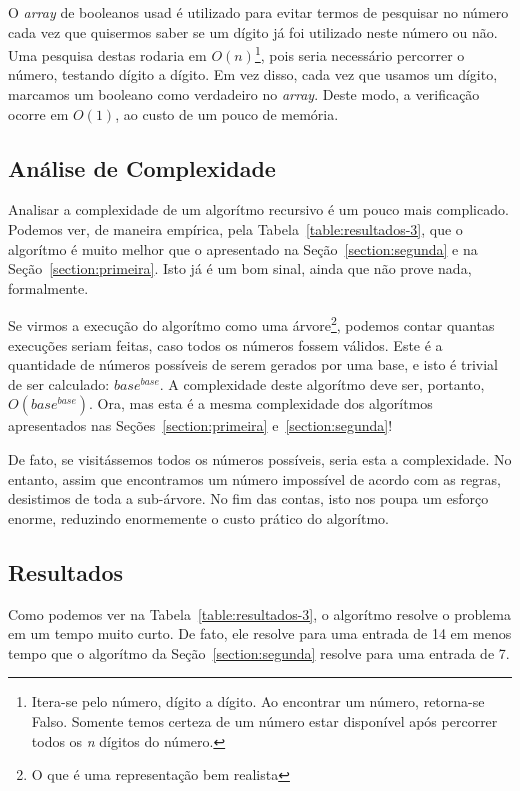 \documentclass[12pt]{article}
\begin{document}
O {\em array} de booleanos {\sf usad} é utilizado para evitar termos de pesquisar no número cada vez que quisermos saber se um dígito já foi utilizado neste número ou não. Uma pesquisa destas rodaria em $O(n)$\footnote{Itera-se pelo número, dígito a dígito. Ao encontrar um número, retorna-se Falso. Somente temos certeza de um número estar disponível após percorrer todos os {\em n} dígitos do número.}, pois seria necessário percorrer o número, testando dígito a dígito. Em vez disso, cada vez que usamos um dígito, marcamos um booleano como verdadeiro no {\em array}. Deste modo, a verificação ocorre em $O(1)$, ao custo de um pouco de memória.

\subsection{Análise de Complexidade}\label{section:terceira:complexidade}

Analisar a complexidade de um algorítmo recursivo é um pouco mais complicado. Podemos ver, de maneira empírica, pela Tabela~\ref{table:resultados-3}, que o algorítmo é muito melhor que o apresentado na Seção~\ref{section:segunda} e na Seção~\ref{section:primeira}. Isto já é um bom sinal, ainda que não prove nada, formalmente.

Se virmos a execução do algorítmo como uma árvore\footnote{O que é uma representação bem realista}, podemos contar quantas execuções seriam feitas, caso todos os números fossem válidos. Este é a quantidade de números possíveis de serem gerados por uma base, e isto é trivial de ser calculado: $base^{base}$. A complexidade deste algorítmo deve ser, portanto, $O(base^{base})$. Ora, mas esta é a mesma complexidade dos algorítmos apresentados nas Seções~\ref{section:primeira} e~\ref{section:segunda}!

De fato, se visitássemos todos os números possíveis, seria esta a complexidade. No entanto, assim que encontramos um número impossível de acordo com as regras, desistimos de toda a sub-árvore. No fim das contas, isto nos poupa um esforço enorme, reduzindo enormemente o custo prático do algorítmo.

\subsection{Resultados}\label{section:terceira:resultados}

Como podemos ver na Tabela~\ref{table:resultados-3}, o algorítmo resolve o problema em um tempo muito curto. De fato, ele resolve para uma entrada de 14 em menos tempo que o algorítmo da Seção~\ref{section:segunda} resolve para uma entrada de 7.
\end{document}
